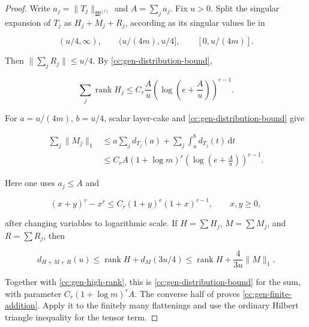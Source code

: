 \documentclass[10pt,reqno]{amsart}
\theoremstyle{plain}
\theoremstyle{definition}
\theoremstyle{remark}
\begin{document}
\begin{proof}
Write \(a_j=\|T_j\|_{\mathfrak W^{[r]}}\) and
\(A=\sum_ja_j\).  Fix \(u>0\).  Split the singular expansion of \(T_j\)
as \(H_j+M_j+R_j\), according as its singular values lie in

\[
 (u/4,\infty),\qquad (u/(4m),u/4],\qquad[0,u/(4m)].
\]

Then \(\|\sum_jR_j\|\leq u/4\).  By
\eqref{cc:gen-distribution-bound},

\begin{equation}
 \sum_j\operatorname{rank}H_j
 \leq C_r\frac Au
 \left(\log\left(e+\frac Au\right)\right)^{r-1}.
 \label{cc:gen-high-rank}
\end{equation}

For \(a=u/(4m)\), \(b=u/4\), scalar layer-cake and
\eqref{cc:gen-distribution-bound} give

\begin{align*}
 \sum_j\|M_j\|_1
 &\leq a\sum_jd_{T_j}(a)
 +\sum_j\int_a^bd_{T_j}(t)\,\mathrm dt\\
 &\leq C_rA(1+\log m)^r
 \left(\log\left(e+\frac Au\right)\right)^{r-1}.
\end{align*}

Here one uses \(a_j\leq A\) and

\[
 (x+y)^r-x^r\leq C_r(1+y)^r(1+x)^{r-1},
 \qquad x,y\geq0,
\]

after changing variables to logarithmic scale.  If
\(H=\sum H_j\), \(M=\sum M_j\), and \(R=\sum R_j\), then

\[
 d_{H+M+R}(u)
 \leq\operatorname{rank}H+d_M(3u/4)
 \leq\operatorname{rank}H+\frac{4}{3u}\|M\|_1.
\]

Together with \eqref{cc:gen-high-rank}, this is
\eqref{cc:gen-distribution-bound} for the sum, with parameter
\(C_r(1+\log m)^rA\).  The converse half of
 proves
\eqref{cc:gen-finite-addition}.  Apply it to the finitely many flattenings
and use the ordinary Hilbert triangle inequality for the tensor term.
\end{proof}
\end{document}

